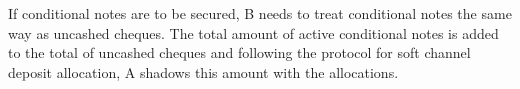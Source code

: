 If conditional notes are to be secured, B needs to treat conditional notes the same way as uncashed cheques.
The total amount of active conditional notes is added to the total of uncashed cheques and following the protocol for soft channel deposit allocation, A shadows this amount with the allocations.
                            